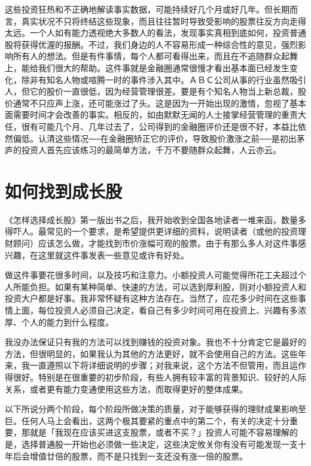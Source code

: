 \documentclass[UTF8,a4paper,zihao=-4,fontset = windows]{ctexart} %
\begin{document}
这些投资狂热和不正确地解读事实数据，可能持续好几个月或好几年。但长期而言，真实状况不只将终结这些现象，而且往往暂时导致受影响的股票往反方向走得太远。一个人如有能力透视绝大多数人的看法，发现事实真相到底如何，投资普通股将获得优渥的报酬。不过，我们身边的人不容易形成一种综合性的意见，强烈影响所有人的想法。但是有件事情，每个人都可看得出来，而且在不追随群众起舞上，能给我们很大的帮助。这件事就是金融圈通常很慢才看出基本面已经发生变化，除非有知名人物或喧腾一时的事件涉入其中。ＡＢＣ公司从事的行业虽然吸引人，但它的股价一直很低，因为经营管理很差。要是有个知名人物当上新总裁，股价通常不只应声上涨，还可能涨过了头。这是因为一开始出现的激情，忽视了基本面需要时间才会改善的事实。相反的，如由默默无闻的人士接掌经营管理的重责大任，很有可能几个月、几年过去了，公司得到的金融圈评价还是很不好，本益比依然偏低。认清这些情况──在金融圈矫正它的评价，导致股价激涨之前──是初出茅庐的投资人首先应该练习的最简单方法，千万不要随群众起舞，人云亦云。

\section{如何找到成长股}

《怎样选择成长股》第一版出书之后，我开始收到全国各地读者一堆来函，数量多得吓人。最常见的一个要求，是希望提供更详细的资料，说明读者（或他的投资理财顾问）应该怎么做，才能找到市价涨幅可观的股票。由于有那么多人对这件事感兴趣，在这里就这件事发表一些意见或许有好处。

做这件事要花很多时间，以及技巧和注意力。小额投资人可能觉得所花工夫超过个人所能负担。如果有某种简单、快速的方法，可以选到厚利股，则对小额投资人和投资大户都是好事。我非常怀疑有这种方法存在。当然了，应花多少时间在这些事情上面，每位投资人必须自己决定，看自己有多少时间可用在投资上、兴趣有多浓厚、个人的能力到什么程度。

我没办法保证只有我的方法可以找到赚钱的投资对象。我也不十分肯定它是最好的方法，但很明显的，如果我认为其他的方法更好，就不会使用自己的方法。这些年来，我一直遵照以下将详细说明的步骤；对我来说，这个方法不但管用，而且运作得很好。特别是在很重要的初步阶段，有些人拥有较丰富的背景知识、较好的人际关系，或者更有能力变通使用这些方法，而取得更好的整体成果。

以下所说分两个阶段，每个阶段所做决策的质量，对于能够获得的理财成果影响至巨。任何人马上会看出，这两个极其要紧的重点中的第二个，有关的决定十分重要，那就是「我现在应该买进这支股票，或者不买？」投资人可能不容易理解的是，选择普通股一开始也必须做一些决定，这些决定攸关你有没有可能发现一支十年后会增值廿倍的股票，而不是只找到一支还没有涨一倍的股票。
\end{document}
